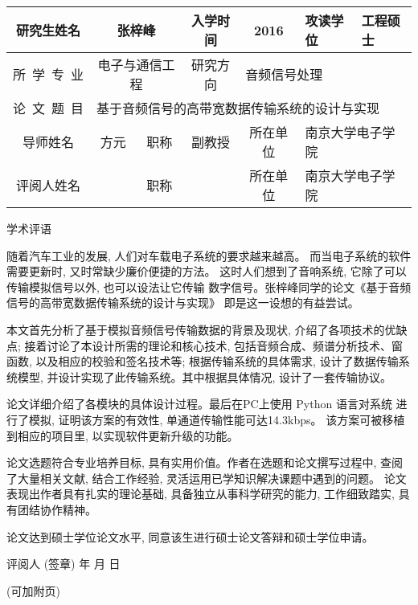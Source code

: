 \documentclass[a4paper,12pt]{article}
\newcommand*{\kaishu}{\CJKfamily{kaiti}}     %
\newcommand*{\heiti}{\CJKfamily{heiti}}     %
\begin{document}
\pagestyle{empty}
\fontsize{12}{16}\selectfont
\begin{center}
\begin{tabularx}{\textwidth}{c|c|c|c|c|X|X}
研究生姓名 & \multicolumn{2}{c|}{张梓峰} & 入学时间 & 2016 & 攻读学位
        & 工程硕士\\\hline
所~学~专~业   & \multicolumn{2}{c|}{电子与通信工程}
        & 研究方向 & \multicolumn{3}{l|}{音频信号处理}\\\hline
论~文~题~目 & \multicolumn{6}{l|}{基于音频信号的高带宽数据传输系统的设计与实现}\\\hline
    导师姓名 & 方元 & 职称 & 副教授 & 所在单位 &
    \multicolumn{2}{l|}{南京大学电子学院}\\\hline
    评阅人姓名  &  & 职称 &      & 所在单位 & 
    \multicolumn{2}{l|}{南京大学电子学院}\\\hline
\end{tabularx}
\vskip 8mm
\Large \kaishu 学术评语\end{center}

\fontsize{12}{14}\selectfont

随着汽车工业的发展, 人们对车载电子系统的要求越来越高。
而当电子系统的软件需要更新时, 又时常缺少廉价便捷的方法。
这时人们想到了音响系统, 它除了可以传输模拟信号以外, 也可以设法让它传输
数字信号。张梓峰同学的论文《基于音频信号的高带宽数据传输系统的设计与实现》
即是这一设想的有益尝试。

本文首先分析了基于模拟音频信号传输数据的背景及现状, 介绍了各项技术的优缺点;
接着讨论了本设计所需的理论和核心技术, 包括音频合成、频谱分析技术、窗函数, 
以及相应的校验和签名技术等; 根据传输系统的具体需求, 设计了数据传输系统模型,
并设计实现了此传输系统。其中根据具体情况, 设计了一套传输协议。

论文详细介绍了各模块的具体设计过程。最后在PC上使用 Python 语言对系统
进行了模拟, 证明该方案的有效性, 单通道传输性能可达14.3kbps。
该方案可被移植到相应的项目里, 以实现软件更新升级的功能。

论文选题符合专业培养目标, 具有实用价值。作者在选题和论文撰写过程中,
查阅了大量相关文献, 结合工作经验, 灵活运用已学知识解决课题中遇到的问题。
论文表现出作者具有扎实的理论基础, 具备独立从事科学研究的能力, 工作细致踏实, 具有团结协作精神。

论文达到硕士学位论文水平, 同意该生进行硕士论文答辩和硕士学位申请。

\vfill
\hfill {\heiti 评阅人} \underline{\hskip 35mm} (签章)\qquad\qquad
\vskip 3mm
\hfill 年\hskip 12mm 月\hskip 12mm 日\qquad\qquad

\noindent(可加附页)
\end{document}
